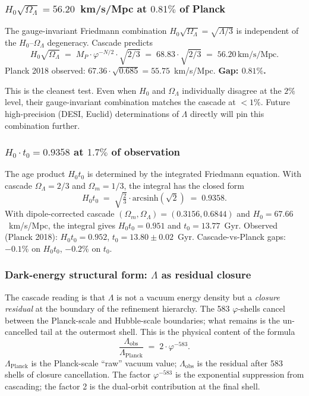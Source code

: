\documentclass[11pt]{article}
\theoremstyle{plain}
\theoremstyle{definition}
\theoremstyle{remark}
\begin{document}
\subsubsection{$H_0 \sqrt{\Omega_\Lambda} = 56.20$~km/s/Mpc at $0.81\%$ of Planck}

The gauge-invariant Friedmann combination $H_0 \sqrt{\Omega_\Lambda} = \sqrt{\Lambda / 3}$ is independent of the $H_0$--$\Omega_\Lambda$ degeneracy. Cascade predicts
\[
  H_0 \sqrt{\Omega_\Lambda} \;=\; M_P \cdot \varphi^{-N/2} \cdot \sqrt{2/3} \;=\; 68.83 \cdot \sqrt{2/3} \;=\; 56.20\,\text{km/s/Mpc}.
\]
Planck 2018 observed: $67.36 \cdot \sqrt{0.685} = 55.75$~km/s/Mpc. \textbf{Gap: $0.81\%$.}

This is the cleanest test. Even when $H_0$ and $\Omega_\Lambda$ individually disagree at the $2\%$ level, their gauge-invariant combination matches the cascade at $< 1\%$. Future high-precision (DESI, Euclid) determinations of $\Lambda$ directly will pin this combination further.

\subsubsection{$H_0 \cdot t_0 = 0.9358$ at $1.7\%$ of observation}

The age product $H_0 t_0$ is determined by the integrated Friedmann equation. With cascade $\Omega_\Lambda = 2/3$ and $\Omega_m = 1/3$, the integral has the closed form
\[
  H_0 t_0 \;=\; \sqrt{\tfrac{2}{3}} \cdot \mathrm{arcsinh}(\sqrt{2}) \;=\; 0.9358.
\]
With dipole-corrected cascade $(\Omega_m, \Omega_\Lambda) = (0.3156, 0.6844)$ and $H_0 = 67.66$~km/s/Mpc, the integral gives $H_0 t_0 = 0.951$ and $t_0 = 13.77$~Gyr. Observed (Planck 2018): $H_0 t_0 = 0.952$, $t_0 = 13.80 \pm 0.02$~Gyr. Cascade-vs-Planck gaps: $-0.1\%$ on $H_0 t_0$, $-0.2\%$ on $t_0$.

\subsubsection{Dark-energy structural form: $\Lambda$ as residual closure}

The cascade reading is that $\Lambda$ is not a vacuum energy density but a \emph{closure residual} at the boundary of the refinement hierarchy. The 583 $\varphi$-shells cancel between the Planck-scale and Hubble-scale boundaries; what remains is the un-cancelled tail at the outermost shell. This is the physical content of the formula
\[
  \frac{\Lambda_\mathrm{obs}}{\Lambda_\mathrm{Planck}} \;=\; 2 \cdot \varphi^{-583}.
\]
$\Lambda_\mathrm{Planck}$ is the Planck-scale ``raw'' vacuum value; $\Lambda_\mathrm{obs}$ is the residual after 583 shells of closure cancellation. The factor $\varphi^{-583}$ is the exponential suppression from cascading; the factor 2 is the dual-orbit contribution at the final shell.
\end{document}
